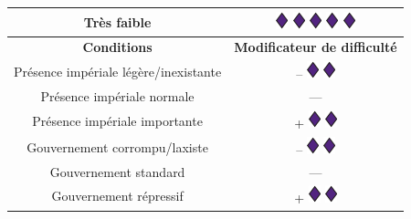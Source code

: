 \documentclass{article}
\begin{document}
\begin{tabular}{|c|c|}
	\hline 
	Très faible & {\Large \includegraphics[height=\fontcharht\font`\B]{../img/dice_purple}} {\Large \includegraphics[height=\fontcharht\font`\B]{../img/dice_purple}} {\Large \includegraphics[height=\fontcharht\font`\B]{../img/dice_purple}} {\Large \includegraphics[height=\fontcharht\font`\B]{../img/dice_purple}} {\Large \includegraphics[height=\fontcharht\font`\B]{../img/dice_purple}} \\ 
	\hline 
	\cellcolor{DarkGold}\textbf{Conditions} & \cellcolor{DarkGold}\textbf{Modificateur de difficulté} \\ 
	\hline 
	Présence impériale légère/inexistante & {\Large -- \includegraphics[height=\fontcharht\font`\B]{../img/dice_purple}} {\Large \includegraphics[height=\fontcharht\font`\B]{../img/dice_purple}} \\ 
	\hline 
	Présence impériale normale & --- \\ 
	\hline 
	Présence impériale importante &  {\Large + \includegraphics[height=\fontcharht\font`\B]{../img/dice_purple}} {\Large \includegraphics[height=\fontcharht\font`\B]{../img/dice_purple}} \\ 
	\hline 
	Gouvernement corrompu/laxiste & {\Large -- \includegraphics[height=\fontcharht\font`\B]{../img/dice_purple}} {\Large \includegraphics[height=\fontcharht\font`\B]{../img/dice_purple}} \\ 
	\hline 
	Gouvernement standard & --- \\ 
	\hline 
	Gouvernement répressif & {\Large + \includegraphics[height=\fontcharht\font`\B]{../img/dice_purple}} {\Large \includegraphics[height=\fontcharht\font`\B]{../img/dice_purple}} \\ 
	\hline 
\end{tabular}
\end{document}
